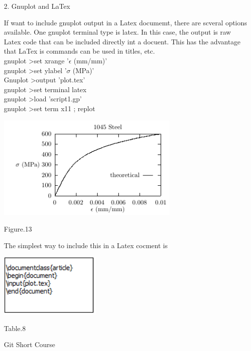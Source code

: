 \documentclass[onecolumn,journal] {IEEEtran}
\begin{document}
\begin{flushleft}
\begin{Large}
2. Gnuplot and LaTex
\end{Large}
\newline
\newline
If want to include gnuplot output in a Latex documemt, there are scveral options available. One gnuplot terminal type is latex. In this case, the output is   raw Latex code that can be included directly int a docuent. This has the advantage that LaTex is commands can be used in titles, etc.\\
gnuplot  \textgreater  set  xrange '$\epsilon$ (mm/mm)'\\
gnuplot  \textgreater  set ylabel '$\sigma$ (MPa)' \\
Gnuplot   \textgreater output 'plot.tex' \\
gnuplot  \textgreater  set  terminal latex \\
gnuplot  \textgreater  load 'script1.gp' \\
gnuplot  \textgreater set term x11 ; replot\\
\end{flushleft}

\center
\includegraphics[width=9cm]{gnulatex.png}
\begin{center}
 Figure.13
\end{center}
\begin{flushleft}

The simplest way to include this in a Latex cocment is \\
\end{flushleft}
\begin{center}
\includegraphics[width=5cm]{codein4.png}
\end{center}
\begin{center}
 Table.8
\end{center}

\begin{flushleft}
\begin{Large}
Git   Short Course
\end{Large}
\end{flushleft}
\end{document}

